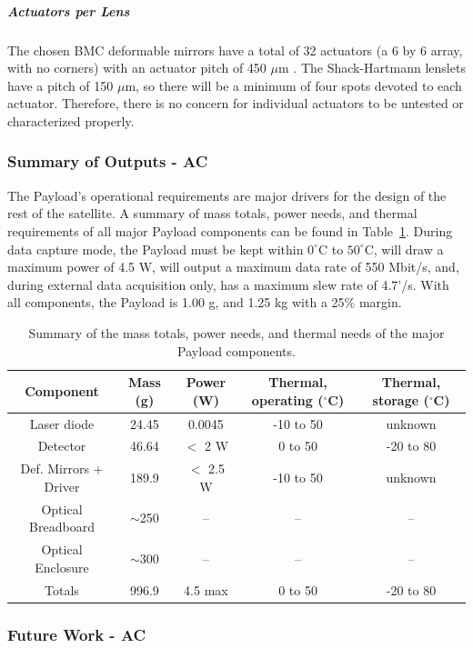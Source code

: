 \documentclass[12pt]{article}
\begin{document}
				\subparagraph{Actuators per Lens}
The chosen BMC deformable mirrors have a total of 32 actuators (a 6 by 6 array, with no corners) with an actuator pitch of 450 $\mu$m \cite{BMC}.  The Shack-Hartmann lenslets have a pitch of 150 $\mu$m, so there will be a minimum of four spots devoted to each actuator.  Therefore, there is no concern for individual actuators to be untested or characterized properly.

			\subsubsection{Summary of Outputs - AC}

The Payload's operational requirements are major drivers for the design of the rest of the satellite. A summary of mass totals, power needs, and thermal requirements of all major Payload components can be found in Table~\ref{fig:payload_summary_table}.  
During data capture mode, the Payload must be kept within $0^\circ$C to $50^\circ$C, will draw a maximum power of 4.5 W, will output a maximum data rate of 550 Mbit/s, and, during external data acquisition only, has a maximum slew rate of 4.7'/s. 
With all components, the Payload is 1.00 g, and 1.25 kg with a 25\% margin.  

\begin{table}
\caption{Summary of the mass totals, power needs, and thermal needs of the major Payload components.}
\begin{tabular}{|c||c|c|c|c|} \hline
	Component & Mass (g) & Power (W) & Thermal, operating ($^\circ$C) & Thermal, storage ($^\circ$C) \\ \hline \hline
Laser diode & 24.45 & 0.0045 & -10 to 50 & unknown \\
Detector & 46.64 & $<$ 2 W & 0 to 50 & -20 to 80 \\
Def. Mirrors + Driver & 189.9 & $<$ 2.5 W & -10 to 50 & unknown \\
Optical Breadboard & $\sim$250 & -- & -- & -- \\
Optical Enclosure & $\sim$300 & -- & -- & -- \\ \hline \hline
Totals & 996.9 & 4.5 max & 0 to 50 & -20 to 80 \\ \hline
\end{tabular}\label{fig:payload_summary_table}
\end{table}

			\subsubsection{Future Work - AC}
\end{document}
